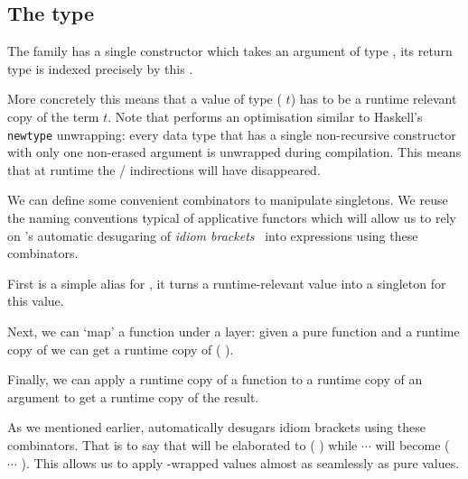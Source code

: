 
\subsection{The  type}\label{sec:datasingleton}

The  family has a single constructor
which takes an argument  of type ,
its return type is indexed precisely by this .


More concretely this means that a value of type
( $t$) has to be a runtime relevant
copy of the term $t$.
%
Note that \idris{} performs an optimisation similar to Haskell's
\texttt{newtype} unwrapping: every data type that has a single
non-recursive constructor with only one non-erased argument
is unwrapped during compilation.
%
This means that at runtime the
 /  indirections
will have disappeared.

We can define some convenient combinators to manipulate
singletons.
%
We reuse the naming conventions typical of applicative
functors which will allow us to rely on \idris{}'s automatic
desugaring of \emph{idiom brackets}~\cite{DBLP:journals/jfp/McbrideP08}
into expressions using these combinators.


First  is a simple alias for ,
it turns a runtime-relevant value  into a singleton for
this value.


Next, we can `map' a function under a  layer: given
a pure function  and a runtime copy of  we
can get a runtime copy of ( ).


Finally, we can apply a runtime copy of a function to a runtime copy of
an argument to get a runtime copy of the result.

As we mentioned earlier, \idris{} automatically desugars idiom brackets
using these combinators. That is to say that
\IdrisKeyword{[|}  \IdrisKeyword{|]} will be elaborated to
( ) while
\IdrisKeyword{[|}   $\cdots$  \IdrisKeyword{|]}
will become
( \IdrisFunction{<\$>}  \IdrisFunction{<*>} $\cdots$ \IdrisFunction{<*>} ).
%
This allows us to apply -wrapped values almost as seamlessly as pure values.
